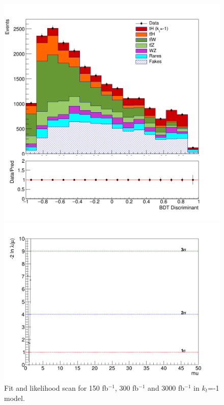 \begin{figure}[ht]
\begin{minipage}[b]{0.48\textwidth}
			\includegraphics[width=\textwidth]{Chapter4/kt-1/3000fb/simple-3000-kt-1.png}
		\end{minipage}
		\hfill
		\begin{minipage}[b]{0.48\textwidth}
			\includegraphics[width=\textwidth]{Chapter4/kt-1/3000fb/Likelihood.png}
		\end{minipage}
		\caption{Fit and likelihood scan for 150 fb$^{-1}$, 300 fb$^{-1}$ and 3000 fb$^{-1}$ in $k_t$=-1 model.}
		\label{hm1}
	\end{figure}
	
	
	
	
	
	


